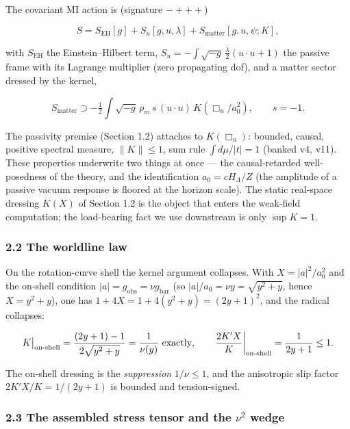 \documentclass[
]{article}
\begin{document}
The covariant MI action is (signature \(-{+}{+}{+}\))

\[
S = S_\mathrm{EH}[g] + S_u[g,u,\lambda] + S_\mathrm{matter}[g,u,\psi;K],
\]

with \(S_\mathrm{EH}\) the Einstein--Hilbert term,
\(S_u = -\int\sqrt{-g}\,\tfrac{\lambda}{2}(u\cdot u+1)\) the passive
frame with its Lagrange multiplier (zero propagating dof), and a matter
sector dressed by the kernel,

\[
S_\mathrm{matter} \supset -\tfrac12\int\sqrt{-g}\,\rho_m\,s\,(u\cdot u)\,K(\Box_u/a_0^2), \qquad s=-1.
\]

The passivity premise (Section 1.2) attaches to \(K(\Box_u)\): bounded,
causal, positive spectral measure, \(\|K\|\le1\), sum rule
\(\int d\mu/|t|=1\) (banked v4, v11). These properties underwrite two
things at once --- the causal-retarded well-posedness of the theory, and
the identification \(a_0 = cH_\Lambda/Z\) (the amplitude of a passive
vacuum response is floored at the horizon scale). The static real-space
dressing \(K(X)\) of Section 1.2 is the object that enters the
weak-field computation; the load-bearing fact we use downstream is only
\(\sup K = 1\).

\subsubsection{2.2 The worldline law}\label{the-worldline-law}

On the rotation-curve shell the kernel argument collapses. With
\(X=|a|^2/a_0^2\) and the on-shell condition
\(|a|=g_\mathrm{obs}=\nu g_\mathrm{bar}\) (so
\(|a|/a_0=\nu y = \sqrt{y^2+y}\), hence \(X=y^2+y\)), one has
\(1+4X=1+4(y^2+y)=(2y+1)^2\), and the radical collapses:

\[
K\big|_{\rm on\text{-}shell} = \frac{(2y+1)-1}{2\sqrt{y^2+y}} = \frac{1}{\nu(y)}\ \text{exactly}, \qquad \frac{2K'X}{K}\bigg|_{\rm on\text{-}shell} = \frac{1}{2y+1}\le 1 .
\]

The on-shell dressing is the \emph{suppression} \(1/\nu\le1\), and the
anisotropic slip factor \(2K'X/K=1/(2y+1)\) is bounded and
tension-signed.

\subsubsection{\texorpdfstring{2.3 The assembled stress tensor and the
\(\nu^2\)
wedge}{2.3 The assembled stress tensor and the \textbackslash nu\^{}2 wedge}}\label{the-assembled-stress-tensor-and-the-nu2-wedge}
\end{document}
